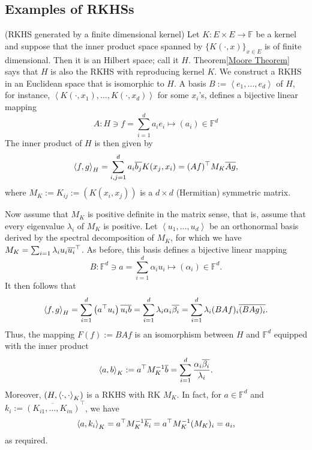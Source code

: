 \documentclass[a4paper,12pt]{article}
\begin{document}
\subsection{Examples of RKHSs}


\begin{ex} (RKHS generated by a finite dimensional kernel) \label{ex rkhs finite dim kernel}
	Let \( K: E \times E \to \mathbb{F} \) be a kernel and suppose that the inner product space spanned by \( \{K(\cdot ,x)\}_{x \in E} \) is of finite dimensional. Then it is an Hilbert space; call it \( H \). Theorem\ref{Moore Theorem} says that \( H \) is also the RKHS with reproducing kernel \( K \).
	We construct a RKHS in an Euclidean space that is isomorphic to \( H \).
	A basis \( B:= \left< e_1, \ldots, e_d  \right> \) of \( H \), for instance, \( \left< K(\cdot ,x_1), \ldots ,K(\cdot ,x_d) \right> \) for some \( x_i \)'s,
	defines a bijective linear mapping
	\[
		A : H \ni f = \sum_{i=1}^{d} a_i e_i \mapsto (a_i) \in \mathbb{F}^d
	\]
	The inner product of \( H \) is then given by
	\[
		\left<f, g \right>_H
		= \sum_{i,j=1}^{d} a_i \overline{b_j}K(x_j,x_i)
		= (Af)^{\top}M_K \overline{Ag},
	\]
	where \( M_K:= K_{ij} := \left( K(x_i,x_j) \right) \) is a \( d \times d \) (Hermitian) symmetric matrix.
	
	Now assume that \( M_K \) is positive definite in the matrix sense, that is, assume that every eigenvalue \( \lambda_i \) of \( M_K \) is positive.
	Let \( \left< u_1, \ldots, u_d  \right> \) be an orthonormal basis derived by the spectral decomposition of \( M_K \), for which we have \( M_K = \sum_{i=1} \lambda_i u_i \overline{u_i}^{\top} \).
	As before, this basis defines a bijective linear mapping
	\[
		B : \mathbb{F}^{d} \ni a = \sum_{i=1}^{d} \alpha_i u_i \mapsto (\alpha_i) \in  \mathbb{F}^{d}.
	\]
	It then follows that
	\[
		\left<f, g \right>_H
		= \sum_{i=1}^{d} \left( a^{\top}u_i \right) \overline{u_i b}
		= \sum_{i=1}^{d} \lambda_i \alpha_i \overline{\beta_i}
		= \sum_{i=1}^{d} \lambda_i(BAf)_i \overline{(BAg)_i}.
	\]
	Thus, the mapping \( F(f) := BAf \) is an isomorphism between \( H \) and \( \mathbb{F}^d \) equipped with the inner product
	\[
		\left<a, b \right>_K := a^{\top}M_K^{-1}\overline{b}
		= \sum_{i=1}^{d} \frac{\alpha_i\overline{\beta_i}}{\lambda_i}.
	\]
	Moreover, \( \left( H, \left<\cdot , \cdot  \right>_{K} \right) \) is a RKHS with RK \( M_K \). In fact, for \( a \in \mathbb{F}^d \) and \( k_i:= \overline{(K_{i1}, \ldots, K_{in})}^{\top} \), we have
	\[
		\left<a, k_i \right>_K = a^{\top}M_K^{-1}\overline{k_i} = a^{\top}M_K^{-1} (M_K)_i = a_i,
	\]
	as required.
	\fin\end{ex}
\end{document}
